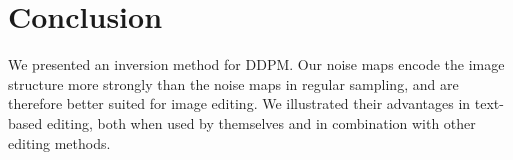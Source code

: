 \section{Conclusion}
\label{conclusion}

We presented an inversion method for DDPM. Our noise maps encode the image structure more strongly than the noise maps in regular sampling, and are therefore better suited for image editing. We illustrated their advantages in text-based editing, both when used by themselves and in combination with other editing methods. 





